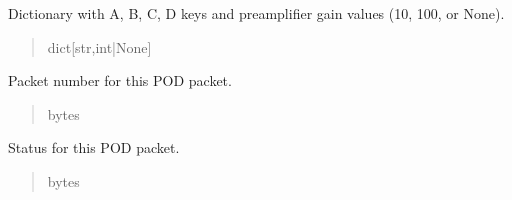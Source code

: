 \documentclass[letterpaper,10pt,english]{sphinxmanual}
\begin{document}
\begin{fulllineitems}
\begin{fulllineitems}
\begin{quote}
\begin{description}
\end{description}\end{quote}

\end{fulllineitems}


\begin{fulllineitems}
\label{\detokenize{PodApi.Packets:PodApi.Packets.Binary5.PacketBinary5._preampGain}}
\pysigstartsignatures
{}
\pysigstopsignatures
\sphinxAtStartPar
Dictionary with A, B, C, D keys and             preamplifier gain values (10, 100, or None).
\begin{quote}\begin{description}
\sphinxAtStartPar
dict{[}str,int|None{]}

\end{description}\end{quote}

\end{fulllineitems}


\begin{fulllineitems}
\label{\detokenize{PodApi.Packets:PodApi.Packets.Binary5.PacketBinary5.packetNumber}}
\pysigstartsignatures
{}
\pysigstopsignatures
\sphinxAtStartPar
Packet number for this POD packet.
\begin{quote}\begin{description}
\sphinxAtStartPar
bytes

\end{description}\end{quote}

\end{fulllineitems}


\begin{fulllineitems}
\label{\detokenize{PodApi.Packets:PodApi.Packets.Binary5.PacketBinary5.status}}
\pysigstartsignatures
{}
\pysigstopsignatures
\sphinxAtStartPar
Status for this POD packet.
\begin{quote}\begin{description}
\sphinxAtStartPar
bytes


\end{description}
\end{quote}
\end{fulllineitems}
\end{fulllineitems}
\end{document}
